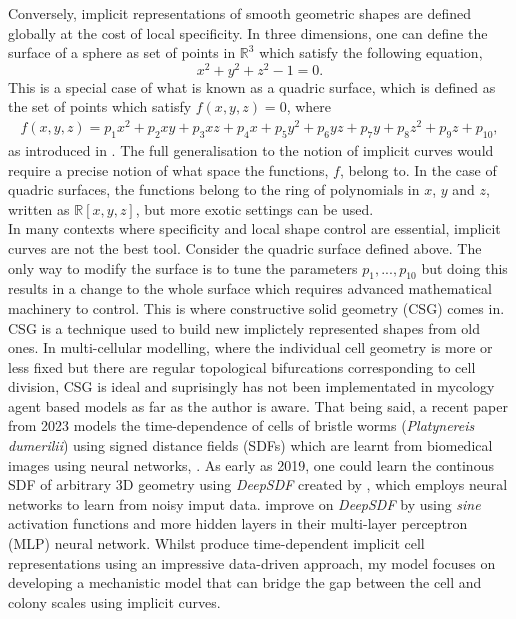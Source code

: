 Conversely, implicit representations of smooth geometric shapes are defined 
globally at the cost of local specificity. In three dimensions, one can 
define the surface of a sphere as set of points in $\mathbb{R}^3$ 
which satisfy the following equation,
\begin{equation*}
    x^2 + y^2 + z^2 - 1 = 0.
\end{equation*}
This is a special case of what is known as a quadric surface,
which is defined as the set of points which satisfy $f(x,y,z) =0$, where
\begin{equation*}
\begin{split}
    f(x,y,z) = p_1 x^2 + p_2 xy + p_3 xz + p_4 x + p_5 y^2 + p_6 yz + p_7 y + p_8 z^2 + p_9 z + p_{10},
\end{split}
\end{equation*}
as introduced in \cite{blinn1982generalization}. The full generalisation to the notion 
of implicit curves would require a precise notion of what space 
the functions, $f$, belong to. In the case of quadric surfaces, 
the functions belong to the ring of polynomials in $x$, $y$ and $z$, written as 
$\mathbb{R}[x,y,z]$, but more exotic settings can be used.
\\

In many contexts where specificity and local shape control are essential, 
implicit curves are not the best tool. Consider the quadric surface defined above.
The only way to modify the surface is to tune the parameters $p_1, ..., p_{10}$ but 
doing this results in a change to the whole surface which requires 
advanced mathematical machinery to control. This is where constructive solid geometry (CSG) comes 
in. 
\\

CSG is a technique used to build new implictely represented shapes from old ones.
In multi-cellular modelling, where the individual cell geometry 
is more or less fixed but there 
are regular topological bifurcations corresponding to cell division,
CSG is ideal and suprisingly has not been implementated in mycology agent 
based models as far as the author is aware.
That being said, a recent paper from 2023 models the time-dependence of cells of bristle 
worms (\textit{Platynereis dumerilii}) using signed distance fields (SDFs) which 
are learnt from biomedical images using neural networks, \cite{wiesner2024generative}.
As early as 2019, one could learn the continous SDF of arbitrary 3D geometry using 
\textit{DeepSDF} created by \cite{park2019deepsdf}, which employs neural networks
to learn from noisy imput data. \cite{wiesner2024generative} improve 
on \textit{DeepSDF} by using \textit{sine} activation functions and 
more hidden layers in their multi-layer perceptron (MLP) neural network. Whilst 
\cite{wiesner2024generative} produce time-dependent implicit cell representations using 
an impressive data-driven approach, my model focuses on developing 
a mechanistic model that can bridge the gap between the cell and colony scales using 
implicit curves.
\\

